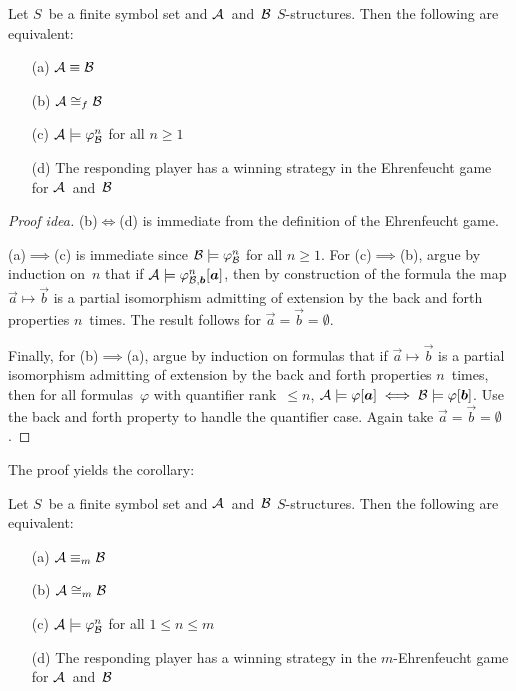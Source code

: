 \begin{thm}
Let \(S\)~be a finite symbol set and \(\mathcal{A}\)~and~\(\mathcal{B}\) \(S\)-structures. Then the following are equivalent:
\begin{enumerate}[itemsep=0pt]
\item[(a)] \(\mathcal{A}\equiv\mathcal{B}\)
\item[(b)] \(\mathcal{A}\cong_f\mathcal{B}\)
\item[(c)] \(\mathcal{A}\models\varphi_{\mathcal{B}}^n\) for all \(n\ge 1\)
\item[(d)] The responding player has a winning strategy in the Ehrenfeucht game for \(\mathcal{A}\)~and~\(\mathcal{B}\)
\end{enumerate}
\end{thm}
\begin{proof}[Proof idea]
(b)\(\iff\)(d) is immediate from the definition of the Ehrenfeucht game.

(a)\(\implies\)(c) is immediate since \(\mathcal{B}\models\varphi_{\mathcal{B}}^n\) for all \(n\ge1\). For (c)\(\implies\)(b), argue by induction on~\(n\) that if \(\mathcal{A}\models\varphi_{\mathcal{B},\boldsymbol{b}}^n[\boldsymbol{a}]\), then by construction of the formula the map \(\vec{a}\mapsto\vec{b}\) is a partial isomorphism admitting of extension by the back and forth properties \(n\)~times. The result follows for \(\vec{a}=\vec{b}=\emptyset\).

Finally, for (b)\(\implies\)(a), argue by induction on formulas that if \(\vec{a}\mapsto\vec{b}\) is a partial isomorphism admitting of extension by the back and forth properties \(n\)~times, then for all formulas~\(\varphi\) with quantifier rank~\(\le n\), \(\mathcal{A}\models\varphi[\boldsymbol{a}]\iff\mathcal{B}\models\varphi[\boldsymbol{b}]\). Use the back and forth property to handle the quantifier case. Again take \(\vec{a}=\vec{b}=\emptyset\).
\end{proof}
\noindent The proof yields the corollary:
\begin{cor}
Let \(S\)~be a finite symbol set and \(\mathcal{A}\)~and~\(\mathcal{B}\) \(S\)-structures. Then the following are equivalent:
\begin{enumerate}[itemsep=0pt]
\item[(a)] \(\mathcal{A}\equiv_m\mathcal{B}\)
\item[(b)] \(\mathcal{A}\cong_m\mathcal{B}\)
\item[(c)] \(\mathcal{A}\models\varphi_{\mathcal{B}}^n\) for all \(1\le n\le m\)
\item[(d)] The responding player has a winning strategy in the \(m\)-Ehrenfeucht game for \(\mathcal{A}\)~and~\(\mathcal{B}\)
\end{enumerate}
\end{cor}
